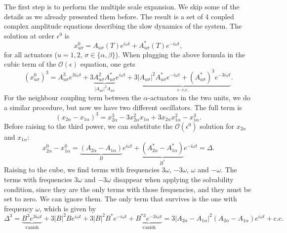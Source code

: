 \documentclass[11pt, a4paper]{article} %
\begin{document}
\begin{appendices}
The first step is to perform the multiple scale expansion. We skip some of the details as we already presented them before. 
The result is a set of 4 coupled complex amplitude equations describing the slow dynamics of the system. 
The solution at order $\epsilon^0$ is 
\begin{equation}
    x_{u\sigma}^0 = A_{u\sigma}(T)e^{i\omega t} + A_{u\sigma}^*(T)e^{-i\omega t},
\end{equation}
for all actuators ($u=1,2$, $\sigma\in\{\alpha,\beta\}$). When plugging the above formula in the cubic term of the 
$\mathcal{O}(\epsilon)$ equation, one gets
\begin{equation}
    (x_{u\sigma}^0)^3 = A_{u\sigma}^3 e^{3i\omega t} + 3\underbrace{A_{u\sigma}^2 A_{u\sigma}^*}_{|A_{u\sigma}|^2 A_{u\sigma}} e^{i\omega t} 
    + \underbrace{3|A_{u\sigma}|^2 A_{u\sigma}^* e^{-i\omega t} + (A_{u\sigma}^*)^3 e^{-3i\omega t}}_{+\text{ c.c.}}.
\end{equation}
For the neighbour coupling term between the $\alpha$-actuators in the two units, we do a similar procedure, but now we have two different oscillators. 
The full term is 
\begin{equation}
    (x_{2\alpha} - x_{1\alpha})^3 = x_{2\alpha}^3 - 3x_{2\alpha}^2 x_{1\alpha} + 3x_{2\alpha} x_{1\alpha}^2 - x_{1\alpha}^3.
\end{equation}
Before raising to the third power, we can substitute the $\mathcal{O}(\epsilon^0)$ solution for $x_{2\alpha}$ and $x_{1\alpha}$:
\begin{equation}
x_{2\alpha}^0 - x_{1\alpha}^0 = \underbrace{(A_{2\alpha} - A_{1\alpha})}_{B} e^{i \omega t} 
+ \underbrace{(A_{2\alpha}^* - A_{1\alpha}^*)}_{B^*} e^{-i \omega t} = \Delta.
\end{equation}
Raising to the cube, we find terms with frequencies $3\omega$, $-3\omega$, $\omega$ and $-\omega$. 
The terms with frequencies $3\omega$ and $-3\omega$ disappear when applying the solvability condition, since 
they are the only terms with those frequencies, and they must be set to zero.
We can ignore them. The only term that survives is the one with frequency $\omega$, which is given by
\begin{equation}
\Delta^3 = \underbrace{B^3 e^{3i \omega t}}_{\text{vanish}} + 3 |B|^2 B e^{i \omega t} + 3 |B|^2 B^* e^{-i \omega t} 
+ \underbrace{B^{*3} e^{-3i \omega t}}_{\text{vanish}}
 = 3 |A_{2\alpha} - A_{1\alpha}|^2 (A_{2\alpha} - A_{1\alpha}) e^{i \omega t} + \text{c.c.}
\end{equation}


\end{appendices}
\end{document}
